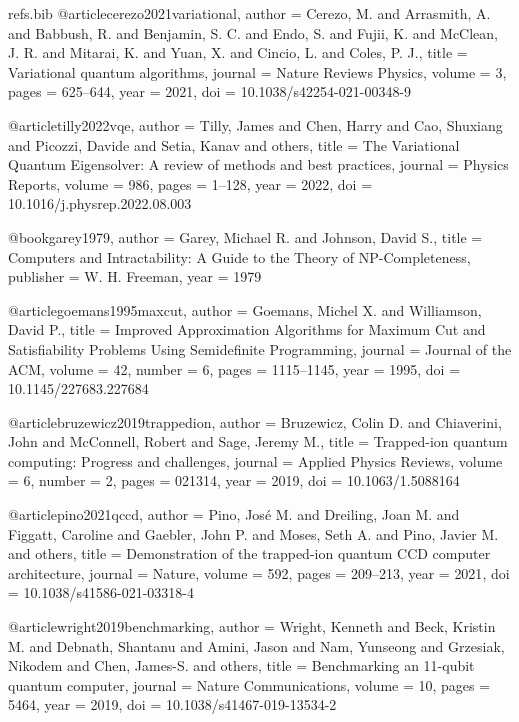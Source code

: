 \begin{filecontents*}{refs.bib}
@article{cerezo2021variational,
  author  = {Cerezo, M. and Arrasmith, A. and Babbush, R. and Benjamin, S. C. and Endo, S. and Fujii, K. and McClean, J. R. and Mitarai, K. and Yuan, X. and Cincio, L. and Coles, P. J.},
  title   = {Variational quantum algorithms},
  journal = {Nature Reviews Physics},
  volume  = {3},
  pages   = {625--644},
  year    = {2021},
  doi     = {10.1038/s42254-021-00348-9}
}

@article{tilly2022vqe,
  author  = {Tilly, James and Chen, Harry and Cao, Shuxiang and Picozzi, Davide and Setia, Kanav and others},
  title   = {The Variational Quantum Eigensolver: A review of methods and best practices},
  journal = {Physics Reports},
  volume  = {986},
  pages   = {1--128},
  year    = {2022},
  doi     = {10.1016/j.physrep.2022.08.003}
}

@book{garey1979,
  author    = {Garey, Michael R. and Johnson, David S.},
  title     = {Computers and Intractability: A Guide to the Theory of NP-Completeness},
  publisher = {W. H. Freeman},
  year      = {1979}
}

@article{goemans1995maxcut,
  author  = {Goemans, Michel X. and Williamson, David P.},
  title   = {Improved Approximation Algorithms for Maximum Cut and Satisfiability Problems Using Semidefinite Programming},
  journal = {Journal of the ACM},
  volume  = {42},
  number  = {6},
  pages   = {1115--1145},
  year    = {1995},
  doi     = {10.1145/227683.227684}
}

@article{bruzewicz2019trappedion,
  author  = {Bruzewicz, Colin D. and Chiaverini, John and McConnell, Robert and Sage, Jeremy M.},
  title   = {Trapped-ion quantum computing: Progress and challenges},
  journal = {Applied Physics Reviews},
  volume  = {6},
  number  = {2},
  pages   = {021314},
  year    = {2019},
  doi     = {10.1063/1.5088164}
}

@article{pino2021qccd,
  author  = {Pino, Jos{\'e} M. and Dreiling, Joan M. and Figgatt, Caroline and Gaebler, John P. and Moses, Seth A. and Pino, Javier M. and others},
  title   = {Demonstration of the trapped-ion quantum CCD computer architecture},
  journal = {Nature},
  volume  = {592},
  pages   = {209--213},
  year    = {2021},
  doi     = {10.1038/s41586-021-03318-4}
}

@article{wright2019benchmarking,
  author  = {Wright, Kenneth and Beck, Kristin M. and Debnath, Shantanu and Amini, Jason and Nam, Yunseong and Grzesiak, Nikodem and Chen, James-S. and others},
  title   = {Benchmarking an 11-qubit quantum computer},
  journal = {Nature Communications},
  volume  = {10},
  pages   = {5464},
  year    = {2019},
  doi     = {10.1038/s41467-019-13534-2}
}


\end{filecontents*}
